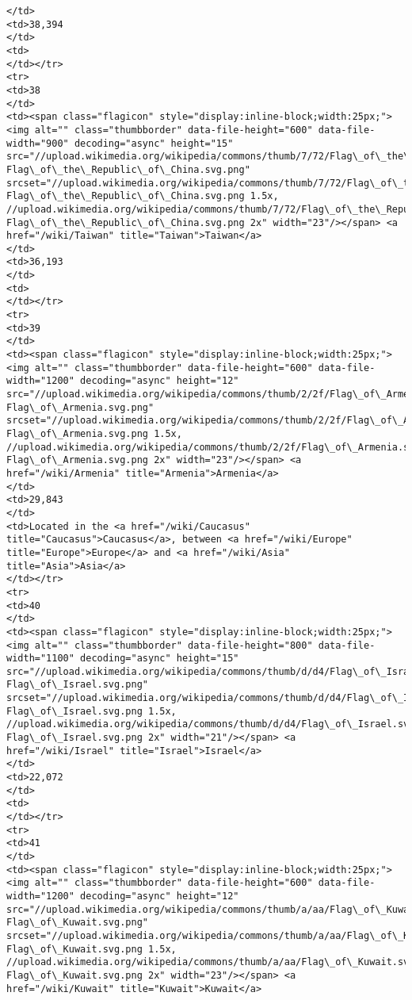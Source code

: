 \documentclass[11pt]{article}
\begin{document}
\begin{Verbatim}[commandchars=\\\{\}]
</td>
<td>38,394
</td>
<td>
</td></tr>
<tr>
<td>38
</td>
<td><span class="flagicon" style="display:inline-block;width:25px;"><img alt="" class="thumbborder" data-file-height="600" data-file-width="900" decoding="async" height="15" src="//upload.wikimedia.org/wikipedia/commons/thumb/7/72/Flag\_of\_the\_Republic\_of\_China.svg/23px-Flag\_of\_the\_Republic\_of\_China.svg.png" srcset="//upload.wikimedia.org/wikipedia/commons/thumb/7/72/Flag\_of\_the\_Republic\_of\_China.svg/35px-Flag\_of\_the\_Republic\_of\_China.svg.png 1.5x, //upload.wikimedia.org/wikipedia/commons/thumb/7/72/Flag\_of\_the\_Republic\_of\_China.svg/45px-Flag\_of\_the\_Republic\_of\_China.svg.png 2x" width="23"/></span> <a href="/wiki/Taiwan" title="Taiwan">Taiwan</a>
</td>
<td>36,193
</td>
<td>
</td></tr>
<tr>
<td>39
</td>
<td><span class="flagicon" style="display:inline-block;width:25px;"><img alt="" class="thumbborder" data-file-height="600" data-file-width="1200" decoding="async" height="12" src="//upload.wikimedia.org/wikipedia/commons/thumb/2/2f/Flag\_of\_Armenia.svg/23px-Flag\_of\_Armenia.svg.png" srcset="//upload.wikimedia.org/wikipedia/commons/thumb/2/2f/Flag\_of\_Armenia.svg/35px-Flag\_of\_Armenia.svg.png 1.5x, //upload.wikimedia.org/wikipedia/commons/thumb/2/2f/Flag\_of\_Armenia.svg/46px-Flag\_of\_Armenia.svg.png 2x" width="23"/></span> <a href="/wiki/Armenia" title="Armenia">Armenia</a>
</td>
<td>29,843
</td>
<td>Located in the <a href="/wiki/Caucasus" title="Caucasus">Caucasus</a>, between <a href="/wiki/Europe" title="Europe">Europe</a> and <a href="/wiki/Asia" title="Asia">Asia</a>
</td></tr>
<tr>
<td>40
</td>
<td><span class="flagicon" style="display:inline-block;width:25px;"><img alt="" class="thumbborder" data-file-height="800" data-file-width="1100" decoding="async" height="15" src="//upload.wikimedia.org/wikipedia/commons/thumb/d/d4/Flag\_of\_Israel.svg/21px-Flag\_of\_Israel.svg.png" srcset="//upload.wikimedia.org/wikipedia/commons/thumb/d/d4/Flag\_of\_Israel.svg/32px-Flag\_of\_Israel.svg.png 1.5x, //upload.wikimedia.org/wikipedia/commons/thumb/d/d4/Flag\_of\_Israel.svg/41px-Flag\_of\_Israel.svg.png 2x" width="21"/></span> <a href="/wiki/Israel" title="Israel">Israel</a>
</td>
<td>22,072
</td>
<td>
</td></tr>
<tr>
<td>41
</td>
<td><span class="flagicon" style="display:inline-block;width:25px;"><img alt="" class="thumbborder" data-file-height="600" data-file-width="1200" decoding="async" height="12" src="//upload.wikimedia.org/wikipedia/commons/thumb/a/aa/Flag\_of\_Kuwait.svg/23px-Flag\_of\_Kuwait.svg.png" srcset="//upload.wikimedia.org/wikipedia/commons/thumb/a/aa/Flag\_of\_Kuwait.svg/35px-Flag\_of\_Kuwait.svg.png 1.5x, //upload.wikimedia.org/wikipedia/commons/thumb/a/aa/Flag\_of\_Kuwait.svg/46px-Flag\_of\_Kuwait.svg.png 2x" width="23"/></span> <a href="/wiki/Kuwait" title="Kuwait">Kuwait</a>

\end{Verbatim}
\end{document}
